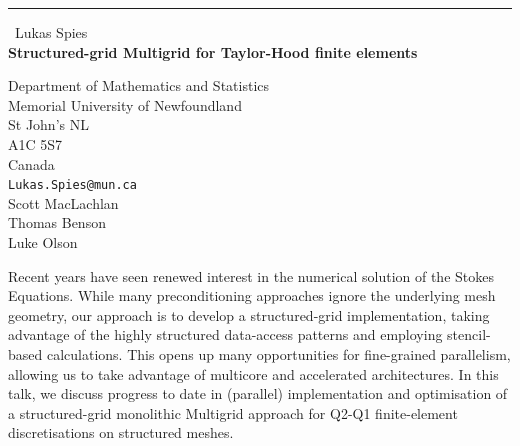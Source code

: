 \documentclass{report}
\begin{document}
\begin{center}
\rule{6in}{1pt} \
{\large Lukas Spies \\
{\bf Structured-grid Multigrid for Taylor-Hood finite elements}}

Department of Mathematics and Statistics \\ Memorial University of Newfoundland \\ St John's NL \\ A1C 5S7 \\ Canada
\\
{\tt Lukas.Spies@mun.ca}\\
Scott MacLachlan\\
Thomas Benson\\
Luke Olson\end{center}

Recent years have seen renewed interest in the numerical solution of the
Stokes Equations. While many preconditioning approaches ignore the
underlying mesh geometry, our approach is to develop a structured-grid
implementation, taking advantage of the highly structured data-access
patterns and employing stencil-based calculations. This opens up many
opportunities for fine-grained parallelism, allowing us to take advantage
of multicore and accelerated architectures. In this talk, we discuss
progress to date in (parallel) implementation and optimisation of a
structured-grid monolithic Multigrid approach for Q2-Q1 finite-element
discretisations on structured meshes.
\end{document}
